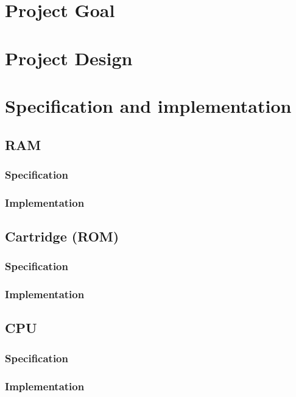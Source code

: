\documentclass[]{report}
\begin{document}
\chapter{Project Goal}

\chapter{Project Design}

\chapter{Specification and implementation}

\section{RAM}

\subsection{Specification}

\subsection{Implementation}

\section{Cartridge (ROM)}

\subsection{Specification}

\subsection{Implementation}

\section{CPU}

\subsection{Specification}

\subsection{Implementation}
\end{document}
